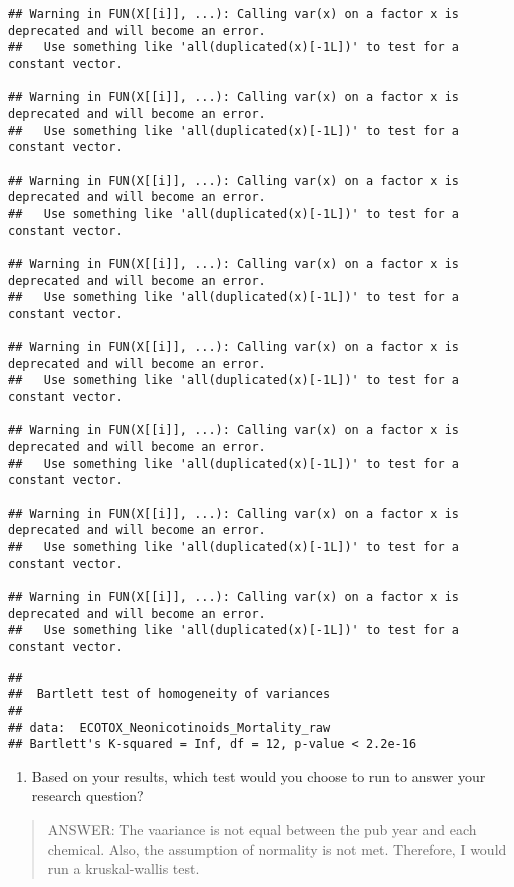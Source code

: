 \documentclass[]{article}
\providecommand{\tightlist}{%
  \setlength{\itemsep}{0pt}\setlength{\parskip}{0pt}}
\begin{document}
\begin{verbatim}
## Warning in FUN(X[[i]], ...): Calling var(x) on a factor x is deprecated and will become an error.
##   Use something like 'all(duplicated(x)[-1L])' to test for a constant vector.

## Warning in FUN(X[[i]], ...): Calling var(x) on a factor x is deprecated and will become an error.
##   Use something like 'all(duplicated(x)[-1L])' to test for a constant vector.

## Warning in FUN(X[[i]], ...): Calling var(x) on a factor x is deprecated and will become an error.
##   Use something like 'all(duplicated(x)[-1L])' to test for a constant vector.

## Warning in FUN(X[[i]], ...): Calling var(x) on a factor x is deprecated and will become an error.
##   Use something like 'all(duplicated(x)[-1L])' to test for a constant vector.

## Warning in FUN(X[[i]], ...): Calling var(x) on a factor x is deprecated and will become an error.
##   Use something like 'all(duplicated(x)[-1L])' to test for a constant vector.

## Warning in FUN(X[[i]], ...): Calling var(x) on a factor x is deprecated and will become an error.
##   Use something like 'all(duplicated(x)[-1L])' to test for a constant vector.

## Warning in FUN(X[[i]], ...): Calling var(x) on a factor x is deprecated and will become an error.
##   Use something like 'all(duplicated(x)[-1L])' to test for a constant vector.

## Warning in FUN(X[[i]], ...): Calling var(x) on a factor x is deprecated and will become an error.
##   Use something like 'all(duplicated(x)[-1L])' to test for a constant vector.
\end{verbatim}

\begin{verbatim}
## 
##  Bartlett test of homogeneity of variances
## 
## data:  ECOTOX_Neonicotinoids_Mortality_raw
## Bartlett's K-squared = Inf, df = 12, p-value < 2.2e-16
\end{verbatim}

\begin{enumerate}
\def\labelenumi{\arabic{enumi}.}
\setcounter{enumi}{5}
\tightlist
\item
  Based on your results, which test would you choose to run to answer
  your research question?
\end{enumerate}

\begin{quote}
ANSWER: The vaariance is not equal between the pub year and each
chemical. Also, the assumption of normality is not met. Therefore, I
would run a kruskal-wallis test.
\end{quote}
\end{document}
